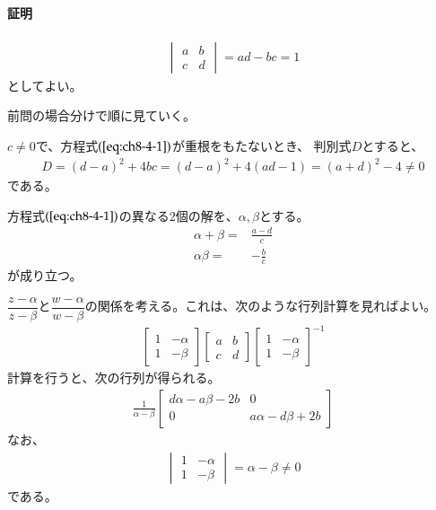 \paragraph{証明}
\begin{align*}
    \begin{vmatrix}
        a&b\\
        c&d
    \end{vmatrix}
    =ad-bc=1
\end{align*}
としてよい。

前問の場合分けで順に見ていく。

$c\neq0$で、方程式$(\ref{eq:ch8-4-1})$が重根をもたないとき、
判別式$D$とすると、
\begin{align*}
    D=(d-a)^2+4bc
    =(d-a)^2+4(ad-1)
    =(a+d)^2-4\neq0
\end{align*}
である。

方程式$(\ref{eq:ch8-4-1})$の異なる2個の解を、$\alpha,\beta$とする。
\begin{align*}
    \alpha+\beta=&\frac{a-d}{c}\\
    \alpha\beta=&-\frac{b}{c}
\end{align*}
が成り立つ。

$\dfrac{z-\alpha}{z-\beta}$と$\dfrac{w-\alpha}{w-\beta}$の関係を考える。これは、次のような行列計算を見ればよい。
\begin{align*}
    \begin{bmatrix}
        1&-\alpha\\
        1&-\beta
    \end{bmatrix}
    \begin{bmatrix}
        a&b\\
        c&d
    \end{bmatrix}
    \begin{bmatrix}
        1&-\alpha\\
        1&-\beta
    \end{bmatrix}^{-1}
\end{align*}
計算を行うと、次の行列が得られる。
\begin{align*}
    \frac{1}{\alpha-\beta}
    \begin{bmatrix}
        d\alpha-a\beta-2b&0\\
        0&a\alpha-d\beta+2b
    \end{bmatrix}
\end{align*}
なお、
\begin{align*}
    \begin{vmatrix}
        1&-\alpha\\
        1&-\beta
    \end{vmatrix}
    =\alpha-\beta\neq0
\end{align*}
である。

